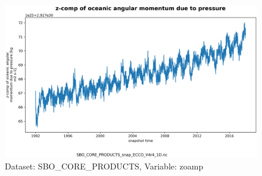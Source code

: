 \begin{figure}[H]
\centering
\includegraphics[scale=0.55]{../images/plots/v4r4/oneD_plots/SBO_Core_Products/zoamp.png}
\caption{Dataset: SBO\_CORE\_PRODUCTS, Variable: zoamp}
\label{tab:table-SBO_CORE_PRODUCTS_zoamp-Plot}
\end{figure}
\newpage
\pagebreak
